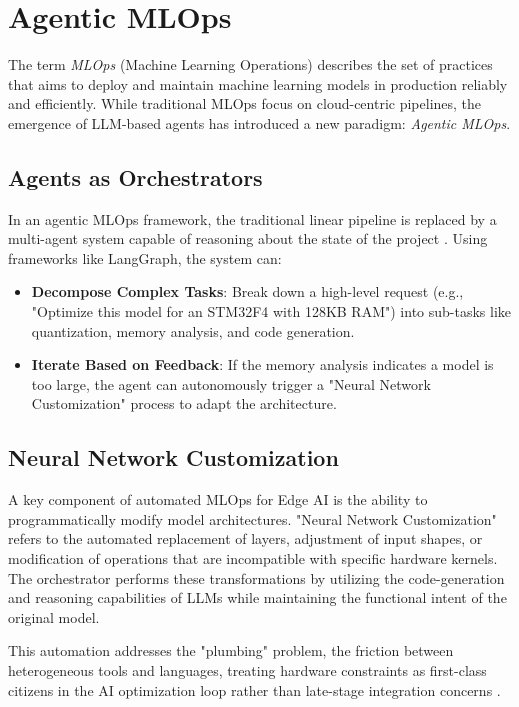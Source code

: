 \section{Agentic MLOps}
\label{sec:agentic-mlops}

The term \textit{MLOps} (Machine Learning Operations) describes the set of practices that aims to deploy and maintain machine learning models in production reliably and efficiently. While traditional MLOps focus on cloud-centric pipelines, the emergence of LLM-based agents has introduced a new paradigm: \textit{Agentic MLOps}.

\subsection{Agents as Orchestrators}
In an agentic MLOps framework, the traditional linear pipeline is replaced by a multi-agent system capable of reasoning about the state of the project \cite{su2025daao, llmhas2025survey}. Using frameworks like LangGraph, the system can:
\begin{itemize}
    \item \textbf{Decompose Complex Tasks}: Break down a high-level request (e.g., "Optimize this model for an STM32F4 with 128KB RAM") into sub-tasks like quantization, memory analysis, and code generation.
    \item \textbf{Iterate Based on Feedback}: If the memory analysis indicates a model is too large, the agent can autonomously trigger a "Neural Network Customization" process to adapt the architecture.
\end{itemize}

\subsection{Neural Network Customization}
A key component of automated MLOps for Edge AI is the ability to programmatically modify model architectures. "Neural Network Customization" refers to the automated replacement of layers, adjustment of input shapes, or modification of operations that are incompatible with specific hardware kernels. The orchestrator performs these transformations by utilizing the code-generation and reasoning capabilities of LLMs while maintaining the functional intent of the original model.

This automation addresses the "plumbing" problem, the friction between heterogeneous tools and languages, treating hardware constraints as first-class citizens in the AI optimization loop rather than late-stage integration concerns \cite{xue2025improve}.
